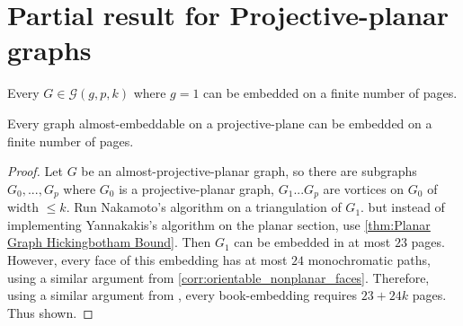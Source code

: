 
\section{Partial result for Projective-planar graphs}

\begin{theorem}
	Every $G \in \mathcal{G}(g, p, k)$ where $g = 1$ can be embedded on a finite number of pages.
\end{theorem}

\begin{theorem}
	Every graph almost-embeddable on a projective-plane can be embedded on a finite number of pages. 
\end{theorem}

\begin{proof}
	Let $G$ be an almost-projective-planar graph, so there are subgraphs $G_0, ..., G_p$ where $G_0$ is a projective-planar graph, $G_1 ... G_p$ are vortices on $G_0$ of width $\leq k$. 
	Run Nakamoto's algorithm on a triangulation of $G_1$. but instead of implementing Yannakakis's algorithm on the planar section, use \cref{thm:Planar Graph Hickingbotham Bound}. Then $G_1$ can be embedded in at most $23$ pages. However, every face of this embedding has at most $24$ monochromatic paths, using a similar argument from \cref{corr:orientable_nonplanar_faces}. Therefore, using a similar argument from \label{lem:orientablesurfaces_monochromatic_edges}, every book-embedding requires $23 + 24k$ pages. Thus shown. 
\end{proof}
